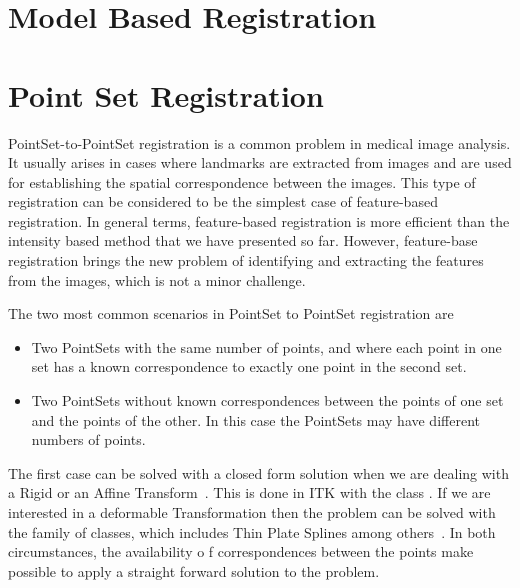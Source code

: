 \clearpage



\section{Model Based Registration}
\label{sec:ModelBasedRegistration}
\ifitkFullVersion

\fi


\section{Point Set Registration}
\label{sec:PointSetRegistration}

PointSet-to-PointSet registration is a common problem in medical image
analysis. It usually arises in cases where landmarks are extracted from images
and are used for establishing the spatial correspondence between the images.
This type of registration can be considered to be the simplest case of
feature-based registration. In general terms, feature-based registration is
more efficient than the intensity based method that we have presented so far.
However, feature-base registration brings the new problem of identifying and
extracting the features from the images, which is not a minor challenge.

The two most common scenarios in PointSet to PointSet registration are

\begin{itemize}
\item Two PointSets with the same number of points, and where each point in one
set has a known correspondence to exactly one point in the second set.
\item Two PointSets without known correspondences between the points of one set
and the points of the other. In this case the PointSets may have different
numbers of points.
\end{itemize}

The first case can be solved with a closed form solution when we are dealing
with a Rigid or an Affine Transform~\cite{Horn1987}. This is done in ITK with
the class . If we are interested in
a deformable Transformation then the problem can be solved with the
 family of classes, which includes Thin Plate Splines
among others~\cite{Rohr2001}. In both circumstances, the availability o f
correspondences between the points make possible to apply a straight forward
solution to the problem.


